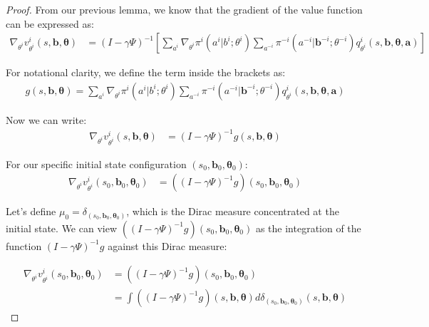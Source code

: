 \documentclass[a4paper,12pt]{report}
\begin{document}
\begin{proof}
    From our previous lemma, we know that the gradient of the value function can be
    expressed as:
    \begin{align}
        \nabla_{\theta^i}v^{i}_{\theta^i}(s, \boldsymbol{b}, \boldsymbol{\theta}) & = (I - \gamma \Psi)^{-1}\left[\sum_{a^i}\nabla_{\theta^i}\pi^{i}(a^{i}|b^{i}; \theta^{i}) \sum_{a^{-i}}\pi^{-i}(a^{-i}|\boldsymbol{b}^{-i}; \theta^{-i}) q^{i}_{\theta^i}(s, \boldsymbol{b}, \boldsymbol{\theta}, \boldsymbol{a})\right]
    \end{align}

    For notational clarity, we define the term inside the brackets as:
    \begin{align}
        g(s, \boldsymbol{b}, \boldsymbol{\theta}) = \sum_{a^i}\nabla_{\theta^i}\pi^{i}(a^{i}|b^{i}; \theta^{i}) \sum_{a^{-i}}\pi^{-i}(a^{-i}|\boldsymbol{b}^{-i}; \theta^{-i}) q^{i}_{\theta^i}(s, \boldsymbol{b}, \boldsymbol{\theta}, \boldsymbol{a})
    \end{align}

    Now we can write:
    \begin{align}
        \nabla_{\theta^i}v^{i}_{\theta^i}(s, \boldsymbol{b}, \boldsymbol{\theta}) & = (I - \gamma \Psi)^{-1}g(s, \boldsymbol{b}, \boldsymbol{\theta})
    \end{align}

    For our specific initial state configuration
    $(s_{0}, \boldsymbol{b}_{0}, \boldsymbol{\theta}_{0})$:
    \begin{align}
        \nabla_{\theta^i}v^{i}_{\theta^i}(s_{0}, \boldsymbol{b}_{0}, \boldsymbol{\theta}_{0}) & = ((I - \gamma \Psi)^{-1}g)(s_{0}, \boldsymbol{b}_{0}, \boldsymbol{\theta}_{0})
    \end{align}

    Let's define
    $\mu_{0} = \delta_{(s_0, \boldsymbol{b}_0, \boldsymbol{\theta}_0)}$, which is the
    Dirac measure concentrated at the initial state. We can view
    $((I - \gamma \Psi)^{-1}g)(s_{0}, \boldsymbol{b}_{0}, \boldsymbol{\theta}_{0})$
    as the integration of the function $(I - \gamma \Psi)^{-1}g$ against this
    Dirac measure:

    \begin{align}
        \nabla_{\theta^i}v^{i}_{\theta^i}(s_{0}, \boldsymbol{b}_{0}, \boldsymbol{\theta}_{0}) & = ((I - \gamma \Psi)^{-1}g)(s_{0}, \boldsymbol{b}_{0}, \boldsymbol{\theta}_{0})                                                                                           \\
                                                                                              & = \int ((I - \gamma \Psi)^{-1}g)(s, \boldsymbol{b}, \boldsymbol{\theta}) d\delta_{(s_0, \boldsymbol{b}_0, \boldsymbol{\theta}_0)}(s, \boldsymbol{b}, \boldsymbol{\theta})
    \end{align}


\end{proof}
\end{document}
